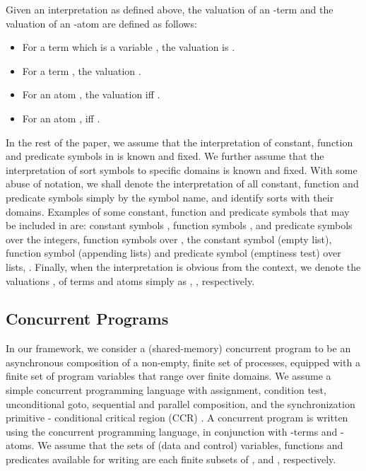 Given an interpretation  as defined above, the valuation
 of an -term  and the valuation  of an
-atom  are defined as follows:

\begin{itemize}
\item For a term  which is a variable , the valuation is .
\item For a term , the valuation . 
\item For an atom , the valuation  iff . 
\item For an atom ,  iff 
.  
\end{itemize}

In the rest of the paper, we assume that the interpretation of
constant, function and predicate symbols in  is known and fixed.
We further assume that the interpretation of sort symbols to specific
domains is known and fixed. With some abuse of notation, we shall
denote the interpretation of all constant, function and predicate
symbols simply by the symbol name, and identify sorts with their
domains. Examples of some constant, function and predicate symbols
that may be included in  are: constant symbols , function
symbols , and predicate symbols  over the integers, function
symbols  over , the constant symbol 
(empty list), function symbol  (appending lists) and
predicate symbol  (emptiness test) over lists, \etc. Finally,
when the interpretation is obvious from the context, we denote the
valuations ,  of terms  and atoms  simply as
, , respectively.  





\subsection{Concurrent Programs}\label{sec:prog}

In our framework, we consider a (shared-memory) concurrent program to
be an asynchronous composition of a non-empty, finite set of
processes, equipped with a finite set of program variables that range
over finite domains. We assume a simple concurrent programming
language with assignment, condition test, unconditional goto,
sequential and parallel composition, and the synchronization primitive
- conditional critical region (CCR) \cite{Hoare71,Hansen81}. A concurrent
program  is written using the concurrent programming language, in
conjunction with -terms and -atoms. We assume that the sets
of (data and control) variables, functions and predicates available
for writing  are each finite subsets of ,
 and , respectively. 




